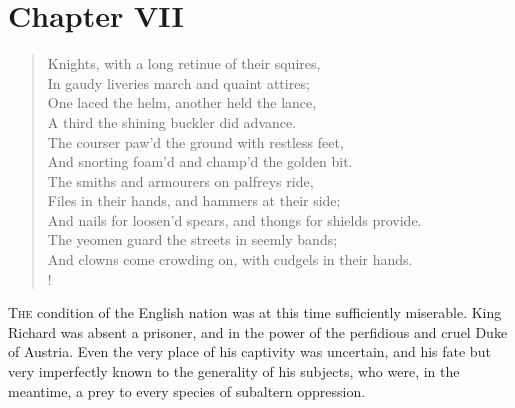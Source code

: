 \chapter{Chapter VII}

\begin{verse}
Knights, with a long retinue of their squires,\\
In gaudy liveries march and quaint attires;\\
One laced the helm, another held the lance,\\
A third the shining buckler did advance.\\
The courser paw'd the ground with restless feet,\\
And snorting foam'd and champ'd the golden bit.\\
The smiths and armourers on palfreys ride,\\
Files in their hands, and hammers at their side;\\
And nails for loosen'd spears, and thongs for shields provide.\\
The yeomen guard the streets in seemly bands;\\
And clowns come crowding on, with cudgels in their hands.\\!
\end{verse}

\lettrine{T}{he} condition of the English nation was at this time
sufficiently
miserable. King Richard was absent a prisoner, and in the power of the
perfidious and cruel Duke of Austria. Even the very place of his
captivity was uncertain, and his fate but very imperfectly known to the
generality of his subjects, who were, in the meantime, a prey to every
species of subaltern oppression.

